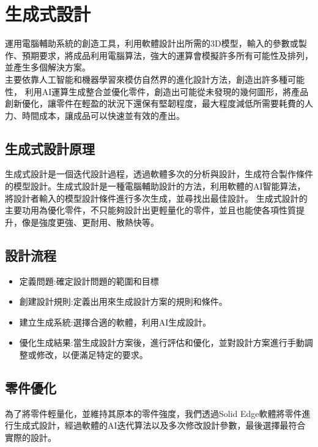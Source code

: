 \chapter{生成式設計}
運用電腦輔助系統的創造工具，利用軟體設計出所需的3D模型，輸入的參數或製作、預期要求，將成品利用電腦算法，強大的運算會模擬許多所有可能性及排列，並產生多個解決方案。\\

主要依靠人工智能和機器學習來模仿自然界的進化設計方法，創造出許多種可能性，
利用AI運算生成整合並優化零件，創造出可能從未發現的幾何圖形，將產品創新優化，讓零件在輕盈的狀況下還保有堅韌程度，最大程度減低所需要耗費的人力、時間成本，讓成品可以快速並有效的產出。\\

\section{生成式設計原理}
生成式設計是一個迭代設計過程，透過軟體多次的分析與設計，生成符合製作條件的模型設計。生成式設計是一種電腦輔助設計的方法，利用軟體的AI智能算法，將設計者輸入的模型設計條件進行多次生成，並尋找出最佳設計。
生成式設計的主要功用為優化零件，不只能夠設計出更輕量化的零件，並且也能使各項性質提升，像是強度更強、更耐用、散熱快等。\\

\section{設計流程}
\begin{itemize}
\item 定義問題:確定設計問題的範圍和目標
\item 創建設計規則:定義出用來生成設計方案的規則和條件。
\item	建立生成系統:選擇合適的軟體，利用AI生成設計。
\item 優化生成結果:當生成設計方案後，進行評估和優化，並對設計方案進行手動調整或修改，以便滿足特定的要求。
\end{itemize}

\section{零件優化}
為了將零件輕量化，並維持其原本的零件強度，我們透過Solid Edge軟體將零件進行生成式設計，經過軟體的AI迭代算法以及多次修改設計參數，最後選擇最符合實際的設計。\\

